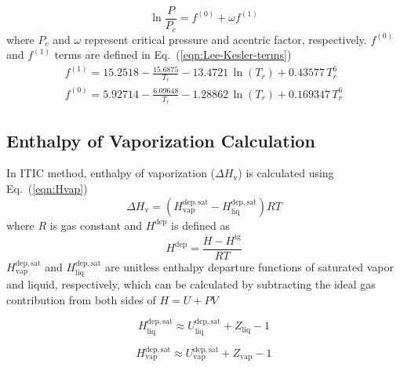 \documentclass[%
 aip,
 jcp,
 sd,%
 amsmath,amssymb,
 reprint,%
]{revtex4-1}
\begin{document}
\begin{equation}
{\ln \frac{P}{P_c}=f^{(0)}+\omega f^{(1)}} 
\label{eqn:Lee-Kesler}
\end{equation}
where $P_c$ and $\omega$ represent critical pressure and acentric factor, respectively. $f^{(0)}$ and $f^{(1)}$ terms are defined in Eq.~(\ref{eqn:Lee-Kesler-terms})
\begin{equation}
\begin{array}{l} 
{f^{(1)} = 15.2518 - \frac{15.6875}{T_r} - 13.4721 \, \ln(T_r) +   0.43577 \, T_r^6 } \\ 
{ f^{(0)} = 5.92714 - \frac{6.09648}{T_r} - 1.28862 \, \ln(T_r) + 0.169347 \, T_r^6  } 
\end{array} \label{eqn:Lee-Kesler-terms}
\end{equation}
	
\subsection{Enthalpy of Vaporization Calculation}\label{sec:HvapCalc}
In ITIC method, enthalpy of vaporization ($\Delta H_\mathrm{v}$) is calculated using Eq.~(\ref{eqn:Hvap})
\begin{equation}
\Delta H_\mathrm{v}= ( H^{\mathrm{dep,sat}}_\mathrm{vap} - H^{\mathrm{dep,sat}}_\mathrm{liq})RT
\label{eqn:Hvap}
\end{equation}
where $R$ is gas constant and $H^{\mathrm{dep}}$ is defined as
\begin{equation}
H^{\mathrm{dep}}=\frac{H-H^{\mathrm{ig}}}{RT}
\label{hdep}
\end{equation}
$H^{\mathrm{dep,sat}}_\mathrm{vap}$ and $H^{\mathrm{dep,sat}}_\mathrm{liq}$ are unitless enthalpy departure functions of saturated vapor and liquid, respectively, which can be calculated by subtracting the ideal gas contribution from both sides of $H=U+PV$

\begin{equation}
H^{\mathrm{dep,sat}}_\mathrm{liq} \approx U^{\mathrm{dep, sat}}_\mathrm{liq}+Z_\mathrm{liq} - 1
\label{eqn:HsatLiq}
\end{equation}

\begin{equation}
H^{\mathrm{dep,sat}}_\mathrm{vap} \approx U^{\mathrm{dep, sat}}_\mathrm{vap}+Z_\mathrm{vap} - 1
\label{eqn:HsatVap}
\end{equation}
\end{document}

